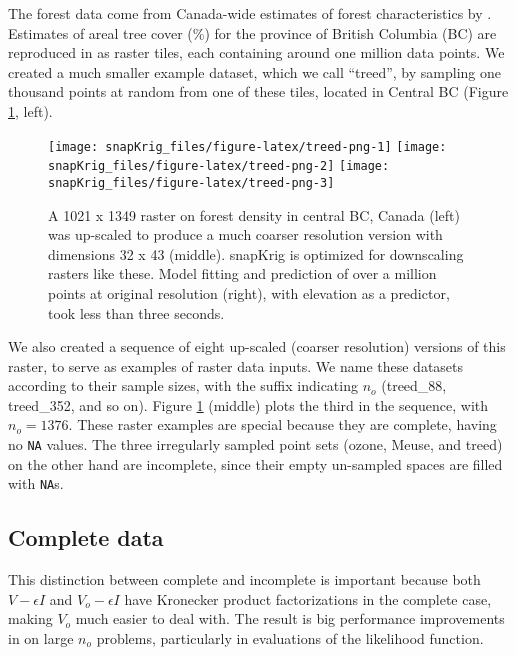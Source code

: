 The forest data come from Canada-wide estimates of forest characteristics by \citet{beaudoin2018tracking}. Estimates of areal tree cover (\%) for the province of British Columbia (BC) are reproduced in  \citep{koch2022rasterbc} as raster tiles, each containing around one million data points. We created a much smaller example dataset, which we call ``treed'', by sampling one thousand points at random from one of these tiles, located in Central BC (Figure \ref{fig:treed-png}, left).

\begin{figure}[htb]
\texttt{[image: snapKrig\_files/figure-latex/treed-png-1]} \texttt{[image: snapKrig\_files/figure-latex/treed-png-2]} \texttt{[image: snapKrig\_files/figure-latex/treed-png-3]} \caption{A 1021 x 1349 raster on forest density in central BC, Canada (left) was up-scaled to produce a much coarser resolution version with dimensions 32 x 43 (middle). snapKrig is optimized for downscaling rasters like these. Model fitting and prediction of over a million points at original resolution (right), with elevation as a predictor, took less than three seconds.}\label{fig:treed-png}
\end{figure}

We also created a sequence of eight up-scaled (coarser resolution) versions of this raster, to serve as examples of raster data inputs. We name these datasets according to their sample sizes, with the suffix indicating \(n_o\) (treed\_88, treed\_352, and so on). Figure \ref{fig:treed-png} (middle) plots the third in the sequence, with \(n_o=1376\). These raster examples are special because they are complete, having no \texttt{NA} values. The three irregularly sampled point sets (ozone, Meuse, and treed) on the other hand are incomplete, since their empty un-sampled spaces are filled with \texttt{NA}s.

\hypertarget{complete-data}{%
\subsection{Complete data}\label{complete-data}}

This distinction between complete and incomplete is important because both \(V - \epsilon I\) and \(V_o - \epsilon I\) have Kronecker product factorizations in the complete case, making \(V_o\) much easier to deal with. The result is big performance improvements in  on large \(n_o\) problems, particularly in evaluations of the likelihood function.

